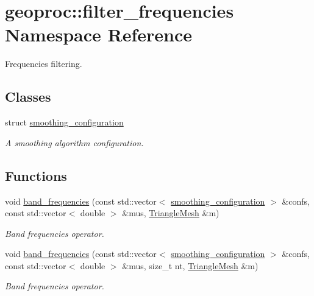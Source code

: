 \hypertarget{namespacegeoproc_1_1filter__frequencies}{}\section{geoproc\+:\+:filter\+\_\+frequencies Namespace Reference}
\label{namespacegeoproc_1_1filter__frequencies}


Frequencies filtering.  


\subsection*{Classes}
\begin{DoxyCompactItemize}
\item 
struct \hyperlink{structgeoproc_1_1filter__frequencies_1_1smoothing__configuration}{smoothing\+\_\+configuration}
\begin{DoxyCompactList}\small\item\em A smoothing algorithm configuration. \end{DoxyCompactList}\end{DoxyCompactItemize}
\subsection*{Functions}
\begin{DoxyCompactItemize}
\item 
void \hyperlink{namespacegeoproc_1_1filter__frequencies_a9a3d38dda8f7703607998e250e264a7c}{band\+\_\+frequencies} (const std\+::vector$<$ \hyperlink{structgeoproc_1_1filter__frequencies_1_1smoothing__configuration}{smoothing\+\_\+configuration} $>$ \&confs, const std\+::vector$<$ double $>$ \&mus, \hyperlink{classgeoproc_1_1TriangleMesh}{Triangle\+Mesh} \&m)
\begin{DoxyCompactList}\small\item\em Band frequencies operator. \end{DoxyCompactList}\item 
void \hyperlink{namespacegeoproc_1_1filter__frequencies_a186988c0c5cb1fa64125db078846814e}{band\+\_\+frequencies} (const std\+::vector$<$ \hyperlink{structgeoproc_1_1filter__frequencies_1_1smoothing__configuration}{smoothing\+\_\+configuration} $>$ \&confs, const std\+::vector$<$ double $>$ \&mus, size\+\_\+t nt, \hyperlink{classgeoproc_1_1TriangleMesh}{Triangle\+Mesh} \&m)
\begin{DoxyCompactList}\small\item\em Band frequencies operator. \end{DoxyCompactList}\end{DoxyCompactItemize}



